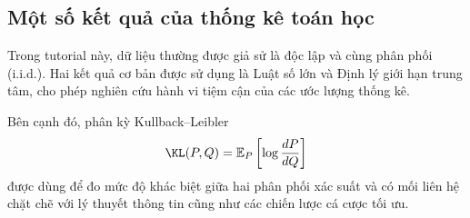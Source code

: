 \subsection{Một số kết quả của thống kê toán học}

Trong tutorial này, dữ liệu thường được giả sử là độc lập và cùng phân
phối (i.i.d.). Hai kết quả cơ bản được sử dụng là Luật số lớn và Định
lý giới hạn trung tâm, cho phép nghiên cứu hành vi tiệm cận của các
ước lượng thống kê.

Bên cạnh đó, phân kỳ Kullback--Leibler
\begin{equation}
\KL(P, Q)
=
\mathbb{E}_P
\left[
\log
\frac{dP}{dQ}
\right]
\end{equation}
được dùng để đo mức độ khác biệt giữa hai phân phối xác suất và có mối
liên hệ chặt chẽ với lý thuyết thông tin cũng như các chiến lược cá
cược tối ưu.
